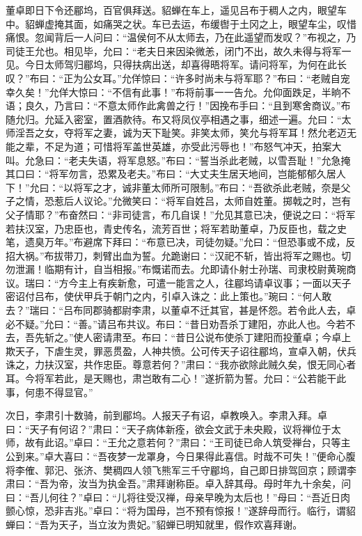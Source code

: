 董卓即日下令还郿坞，百官俱拜送。貂蝉在车上，遥见吕布于稠人之内，眼望车中。貂蝉虚掩其面，如痛哭之状。车已去运，布缓辔于土冈之上，眼望车尘，叹惜痛恨。忽闻背后一人问曰：“温侯何不从太师去，乃在此遥望而发叹？”布视之，乃司徒王允也。相见毕，允曰：“老夫日来因染微恙，闭门不出，故久未得与将军一见。今日太师驾归郿坞，只得扶病出送，却喜得晤将军。请问将军，为何在此长叹？”布曰：“正为公女耳。”允佯惊曰：“许多时尚未与将军耶？”布曰：“老贼自宠幸久矣！”允佯大惊曰：“不信有此事！”布将前事一一告允。允仰面跌足，半晌不语；良久，乃言曰：“不意太师作此禽兽之行！”因挽布手曰：“且到寒舍商议。”布随允归。允延入密室，置酒款待。布又将凤仪亭相遇之事，细述一遍。允曰：“太师淫吾之女，夺将军之妻，诚为天下耻笑。非笑太师，笑允与将军耳！然允老迈无能之辈，不足为道；可惜将军盖世英雄，亦受此污辱也！”布怒气冲天，拍案大叫。允急曰：“老夫失语，将军息怒。”布曰：“誓当杀此老贼，以雪吾耻！”允急掩其口曰：“将军勿言，恐累及老夫。”布曰：“大丈夫生居天地间，岂能郁郁久居人下！”允曰：“以将军之才，诚非董太师所可限制。”布曰：“吾欲杀此老贼，奈是父子之情，恐惹后人议论。”允微笑曰：“将军自姓吕，太师自姓董。掷戟之时，岂有父子情耶？”布奋然曰：“非司徒言，布几自误！”允见其意已决，便说之曰：“将军若扶汉室，乃忠臣也，青史传名，流芳百世；将军若助董卓，乃反臣也，载之史笔，遗臭万年。”布避席下拜曰：“布意已决，司徒勿疑。”允曰：“但恐事或不成，反招大祸。”布拔带刀，刺臂出血为誓。允跪谢曰：“汉祀不斩，皆出将军之赐也。切勿泄漏！临期有计，自当相报。”布慨诺而去。允即请仆射士孙瑞、司隶校尉黄琬商议。瑞曰：“方今主上有疾新愈，可遣一能言之人，往郿坞请卓议事；一面以天子密诏付吕布，使伏甲兵于朝门之内，引卓入诛之：此上策也。”琬曰：“何人敢去？”瑞曰：“吕布同郡骑都尉李肃，以董卓不迁其官，甚是怀怨。若令此人去，卓必不疑。”允曰：“善。”请吕布共议。布曰：“昔日劝吾杀丁建阳，亦此人也。今若不去，吾先斩之。”使人密请肃至。布曰：“昔日公说布使杀丁建阳而投董卓；今卓上欺天子，下虐生灵，罪恶贯盈，人神共愤。公可传天子诏往郿坞，宣卓入朝，伏兵诛之，力扶汉室，共作忠臣。尊意若何？”肃曰：“我亦欲除此贼久矣，恨无同心者耳。今将军若此，是天赐也，肃岂敢有二心！”遂折箭为誓。允曰：“公若能干此事，何患不得显官。”

次日，李肃引十数骑，前到郿坞。人报天子有诏，卓教唤入。李肃入拜。卓曰：“天子有何诏？”肃曰：“天子病体新痊，欲会文武于未央殿，议将禅位于太师，故有此诏。”卓曰：“王允之意若何？”肃曰：“王司徒已命人筑受禅台，只等主公到来。”卓大喜曰：“吾夜梦一龙罩身，今日果得此喜信。时哉不可失！”便命心腹将李傕、郭汜、张济、樊稠四人领飞熊军三千守郿坞，自己即日排驾回京；顾谓李肃曰：“吾为帝，汝当为执金吾。”肃拜谢称臣。卓入辞其母。母时年九十余矣，问曰：“吾儿何往？”卓曰：“儿将往受汉禅，母亲早晚为太后也！”母曰：“吾近日肉颤心惊，恐非吉兆。”卓曰：“将为国母，岂不预有惊报！”遂辞母而行。临行，谓貂蝉曰：“吾为天子，当立汝为贵妃。”貂蝉已明知就里，假作欢喜拜谢。

